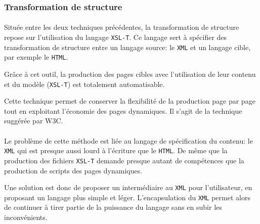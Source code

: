 \subsubsection{Transformation de structure}
\paragraph{}Située entre les deux techniques précédentes, la transformation de structure repose sur l'utilisation du langage \texttt{XSL-T}. Ce langage sert à spécifier des transformation de structure entre un langage source: le \texttt{XML} et un langage cible, par exemple le \texttt{HTML}. 

Grâce à cet outil, la production des pages cibles avec l'utilisation de leur contenu et du modèle (\texttt{XSL-T}) est totalement automatisable.

Cette technique permet de conserver la flexibilité de la production page par page tout en exploitant l'économie des pages dynamiques. Il s'agit de la technique suggérée par W3C.

\paragraph{}Le problème de cette méthode est liée au langage de spécification du contenu: le \texttt{XML} qui est presque aussi lourd à l'écriture que le \texttt{HTML}. De même que la production des fichiers \texttt{XSL-T} demande presque autant de compétences que la production de scripts des pages dynamiques.

Une solution est donc de proposer un intermédiaire au \texttt{XML} pour l'utilisateur, en proposant un langage plus simple et léger. L'encapsulation du \texttt{XML} permet alors de continuer à tirer partie de la puissance du langage sans en subir les inconvénients. 
